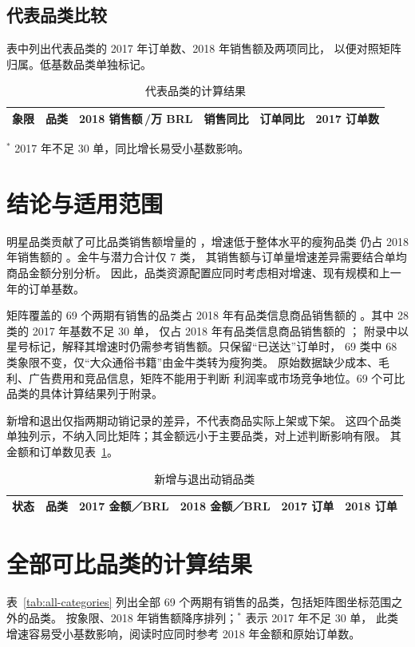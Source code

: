 \documentclass[11pt,a4paper]{ctexart}
\begin{document}
\clearpage
\subsection{代表品类比较}

表中列出代表品类的 2017 年订单数、2018 年销售额及两项同比，
以便对照矩阵归属。低基数品类单独标记。

\begin{table}[H]
\centering
\caption{代表品类的计算结果}
\small
\begin{tabular}{llrrrr}
\toprule
象限 & 品类 & 2018 销售额\,/万 BRL & 销售同比 & 订单同比 & 2017 订单数 \\
\midrule

\end{tabular}
\end{table}
\noindent\footnotesize $^{*}$ 2017 年不足 30 单，同比增长易受小基数影响。\normalsize

\section{结论与适用范围}

明星品类贡献了可比品类销售额增量的 \StarIncrementShare{}，增速低于整体水平的瘦狗品类
仍占 2018 年销售额的 \DogShare{}。金牛与潜力合计仅 7 类，
其销售额与订单量增速差异需要结合单均商品金额分别分析。
因此，品类资源配置应同时考虑相对增速、现有规模和上一年的订单基数。

矩阵覆盖的 69 个两期有销售的品类占 2018 年有品类信息商品销售额的
\CommonRevenueShare{}。其中 28 类的 2017 年基数不足 30 单，
仅占 2018 年有品类信息商品销售额的 \SmallBaseShare{}；
附录中以星号标记，解释其增速时仍需参考销售额。只保留“已送达”订单时，
69 类中 68 类象限不变，仅“大众通俗书籍”由金牛类转为瘦狗类。
原始数据缺少成本、毛利、广告费用和竞品信息，矩阵不能用于判断
利润率或市场竞争地位。69 个可比品类的具体计算结果列于附录。

新增和退出仅指两期动销记录的差异，不代表商品实际上架或下架。
这四个品类单独列示，不纳入同比矩阵；其金额远小于主要品类，对上述判断影响有限。
其金额和订单数见表~\ref{tab:lifecycle}。

\begin{table}[H]
\centering
\caption{新增与退出动销品类}
\label{tab:lifecycle}
\small
\begin{tabular}{llrrrr}
\toprule
状态 & 品类 & 2017 金额／BRL & 2018 金额／BRL & 2017 订单 & 2018 订单 \\
\midrule

\end{tabular}
\end{table}

\clearpage
\appendix
\section{全部可比品类的计算结果}

表~\ref{tab:all-categories} 列出全部 69 个两期有销售的品类，包括矩阵图坐标范围之外的品类。
按象限、2018 年销售额降序排列；$^{*}$ 表示 2017 年不足 30 单，
此类增速容易受小基数影响，阅读时应同时参考 2018 年金额和原始订单数。

\footnotesize
\setlength{\tabcolsep}{3pt}

\normalsize
\end{document}
